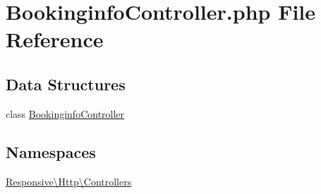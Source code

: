 \hypertarget{_bookinginfo_controller_8php}{}\section{Bookinginfo\+Controller.\+php File Reference}
\label{_bookinginfo_controller_8php}
\subsection*{Data Structures}
\begin{DoxyCompactItemize}
\item 
class \mbox{\hyperlink{class_responsive_1_1_http_1_1_controllers_1_1_bookinginfo_controller}{Bookinginfo\+Controller}}
\end{DoxyCompactItemize}
\subsection*{Namespaces}
\begin{DoxyCompactItemize}
\item 
 \mbox{\hyperlink{namespace_responsive_1_1_http_1_1_controllers}{Responsive\textbackslash{}\+Http\textbackslash{}\+Controllers}}
\end{DoxyCompactItemize}
